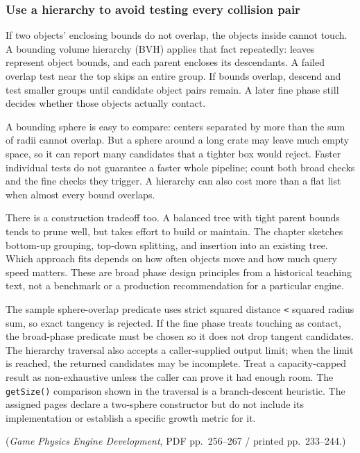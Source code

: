 \subsubsection{Use a hierarchy to avoid testing every collision pair}\label{06-engine-ii-ch033-use-a-hierarchy-to-avoid-testing-every-collision-pair}

If two objects' enclosing bounds do not overlap, the objects inside cannot touch. A bounding volume hierarchy (BVH) applies that fact repeatedly: leaves represent object bounds, and each parent encloses its descendants. A failed overlap test near the top skips an entire group. If bounds overlap, descend and test smaller groups until candidate object pairs remain. A later fine phase still decides whether those objects actually contact.

A bounding sphere is easy to compare: centers separated by more than the sum of radii cannot overlap. But a sphere around a long crate may leave much empty space, so it can report many candidates that a tighter box would reject. Faster individual tests do not guarantee a faster whole pipeline; count both broad checks and the fine checks they trigger. A hierarchy can also cost more than a flat list when almost every bound overlaps.

There is a construction tradeoff too. A balanced tree with tight parent bounds tends to prune well, but takes effort to build or maintain. The chapter sketches bottom-up grouping, top-down splitting, and insertion into an existing tree. Which approach fits depends on how often objects move and how much query speed matters. These are broad phase design principles from a historical teaching text, not a benchmark or a production recommendation for a particular engine.

The sample sphere-overlap predicate uses strict squared distance \texttt{\textless{}} squared radius sum, so exact tangency is rejected. If the fine phase treats touching as contact, the broad-phase predicate must be chosen so it does not drop tangent candidates. The hierarchy traversal also accepts a caller-supplied output limit; when the limit is reached, the returned candidates may be incomplete. Treat a capacity-capped result as non-exhaustive unless the caller can prove it had enough room. The \texttt{getSize()} comparison shown in the traversal is a branch-descent heuristic. The assigned pages declare a two-sphere constructor but do not include its implementation or establish a specific growth metric for it.

(\emph{Game Physics Engine Development}, PDF pp.~256--267 / printed pp.~233--244.)

